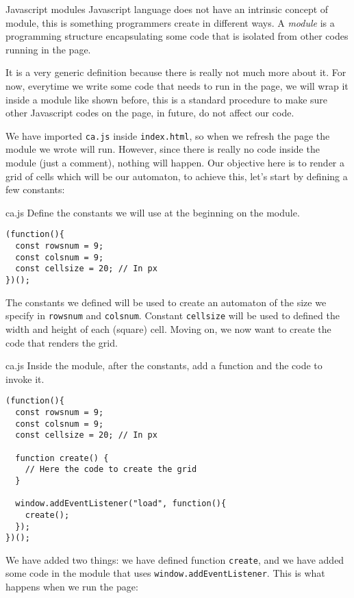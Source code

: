 \begin{tips}{Javascript modules}
Javascript language does not have an intrinsic concept of module, this is something programmers create in
different ways. A \textit{module} is a programming structure encapsulating some code that is isolated
from other codes running in the page.

It is a very generic definition because there is really not much more about it. For now, everytime
we write some code that needs to run in the page, we will wrap it inside a module like shown before,
this is a standard procedure to make sure other Javascript codes on the page, in future, do not
affect our code.
\end{tips}

We have imported \texttt{ca.js} inside \texttt{index.html}, so when we refresh the page the module
we wrote will run. However, since there is really no code inside the module (just a comment),
nothing will happen. Our objective here is to render a grid of cells which will be our automaton,
to achieve this, let's start by defining a few constants:

\begin{programcode}{ca.js}
Define the constants we will use at the beginning on the module.
\begin{verbatim}
(function(){
  const rowsnum = 9;
  const colsnum = 9;
  const cellsize = 20; // In px
})();
\end{verbatim}
\end{programcode}

The constants we defined will be used to create an automaton of the size we specify in 
\texttt{rowsnum} and \texttt{colsnum}. Constant \texttt{cellsize} will be used to defined the
width and height of each (square) cell. Moving on, we now want to create the code that renders the grid.

\begin{programcode}{ca.js}
Inside the module, after the constants, add a function and the code to invoke it.
\begin{verbatim}
(function(){
  const rowsnum = 9;
  const colsnum = 9;
  const cellsize = 20; // In px

  function create() {
    // Here the code to create the grid
  }

  window.addEventListener("load", function(){
    create();
  });
})();
\end{verbatim}
\end{programcode}

We have added two things: we have defined function \texttt{create}, and we have added some code in
the module that uses \texttt{window.addEventListener}. This is what happens when we run the page:


